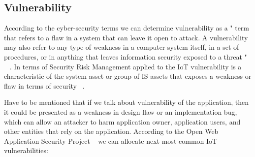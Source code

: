 \documentclass[12pt]{article}
\begin{document}
\newpage
\subsection{Vulnerability}
According to the cyber-security terms we can determine vulnerability as a " term that refers to a flaw in a system that can leave it open to attack. A vulnerability may also refer to any type of weakness in a computer system itself, in a set of procedures, or in anything that leaves information security exposed to a threat "  ~\cite{V} . In terms of Security Risk Management applied to the IoT  vulnerability is a characteristic of the system asset or group of IS assets that exposes a weakness or flaw in terms of security ~\cite{FSSM}. 

Have to be mentioned that if we talk about vulnerability of the application, then it could be presented as a weakness in design flaw or an implementation bug, which can allow an attacker to harm application owner, application users, and other entities that rely on the application. According to the Open Web Application Security Project ~\cite{OWASP} we can allocate next most common IoT vulnerabilities:
\end{document}
